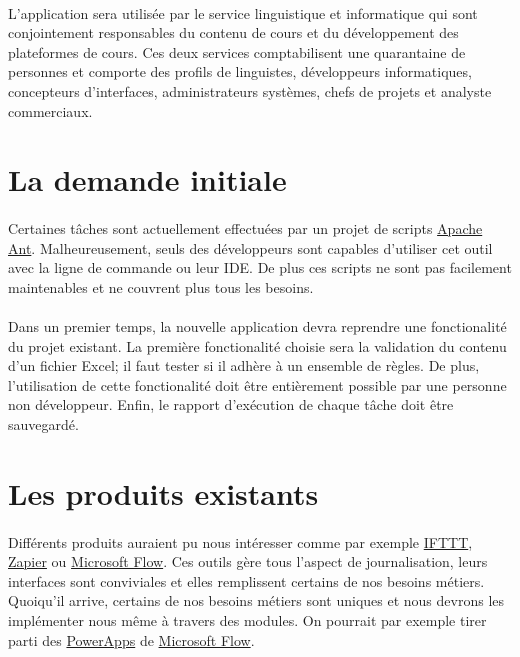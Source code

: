     \paragraph{}
    L'application sera utilisée par le service linguistique et informatique qui sont conjointement responsables du contenu de cours
    et du développement des plateformes de cours.
    Ces deux services comptabilisent une quarantaine de personnes et comporte des profils de linguistes, développeurs informatiques,
    concepteurs d'interfaces, administrateurs systèmes, chefs de projets et analyste commerciaux.

\section{La demande initiale}
\label{sec:initial-demande}

    \paragraph{}
    Certaines tâches sont actuellement effectuées par un projet de scripts \href{https://ant.apache.org/}{Apache Ant}.
    Malheureusement, seuls des développeurs sont capables d'utiliser cet outil avec la ligne de commande ou leur IDE.
    De plus ces scripts ne sont pas facilement maintenables et ne couvrent plus tous les besoins.

    \paragraph{}
    Dans un premier temps, la nouvelle application devra reprendre une fonctionalité du projet existant.
    La première fonctionalité choisie sera la validation du contenu d'un fichier Excel;
    il faut tester si il adhère à un ensemble de règles.
    De plus, l'utilisation de cette fonctionalité doit être entièrement possible par une personne non développeur.
    Enfin, le rapport d'exécution de chaque tâche doit être sauvegardé.

\section{Les produits existants}
\label{sec:existing-products}

    \paragraph{}
    Différents produits auraient pu nous intéresser comme par exemple
    \href{https://ifttt.com/}{IFTTT},
    \href{https://zapier.com/}{Zapier} ou
    \href{https://flow.microsoft.com/fr-fr/}{Microsoft Flow}.
    Ces outils gère tous l'aspect de journalisation, leurs interfaces sont conviviales et elles remplissent certains de nos besoins métiers.
    Quoiqu'il arrive, certains de nos besoins métiers sont uniques et nous devrons les implémenter nous même à travers des modules.
    On pourrait par exemple tirer parti des \href{https://powerapps.microsoft.com/fr-fr/}{PowerApps} de \href{https://flow.microsoft.com/fr-fr/}{Microsoft Flow}.

